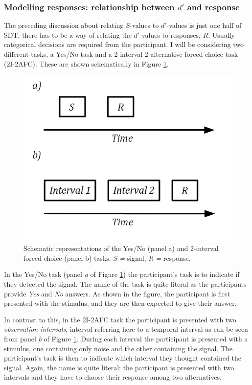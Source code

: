 \documentclass{article}\usepackage{knitr}
\begin{document}
\subsubsection{Modelling responses: relationship between $d'$ and response}

The preceding discussion about relating $S$-values to $d'$-values is just one half of SDT, there has to be a way of relating the $d'$-values to responses, $R$. Usually categorical decisions are required from the participant. I will be considering two different tasks, a Yes/No task and a 2-interval 2-alternative forced choice task (2I-2AFC). These are shown schematically in Figure \ref{fig:YesNoAfc}.

\begin{figure}[!htb]
\centering
\includegraphics[scale = 0.5]{YesNoAfc}
\caption{Schematic representations of the Yes/No (panel a) and 2-interval forced choice (panel b) tasks. \textit{S = } signal, \textit{R =} response.}
\label{fig:YesNoAfc}
\end{figure}

In the Yes/No task (panel \textit{a} of Figure \ref{fig:YesNoAfc}) the participant's task is to indicate if they detected the signal. The name of the task is quite literal as the participants provide \textit{Yes} and \textit{No} answers. As shown in the figure, the participant is first presented with the stimulus, and they are then expected to give their answer.

In contrast to this, in the 2I-2AFC task the participant is presented with two \textit{observation intervals}, interval referring here to a temporal interval as can be seen from panel \textit{b} of Figure \ref{fig:YesNoAfc}. During each interval the participant is presented with a stimulus, one containing only noise and the other containing the signal. The participant's task is then to indicate which interval they thought contained the signal. Again, the name is quite literal: the participant is presented with two intervals and they have to choose their response among two alternatives.
\end{document}
